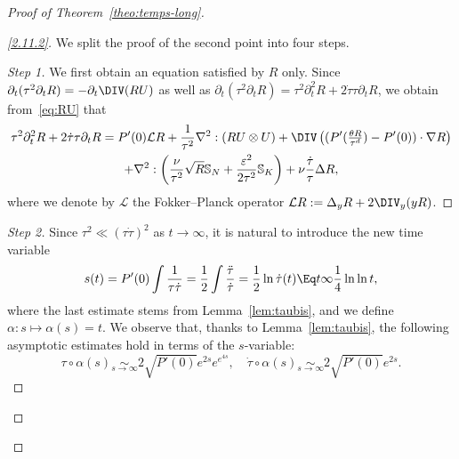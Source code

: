 \begin{proof}[Proof of Theorem~\ref{theo:temps-long}]
\begin{proof}[\eqref{2.11.2}]
We split the proof of the second point into four steps.

\begin{proof}[Step 1]
We first obtain an equation satisfied by $R$ only. Since $\partial_t(\tau^2 \partial_t R) = - \partial_t \DIV (R U)$ as well as $\partial_t(\tau^2 \partial_t R) = \tau^2 \partial_t^2 R + 2\dot \tau
\tau \partial_t R$, we obtain from~\eqref{eq:RU} that
\begin{multline*}
\tau^2 \partial_t^2 R + 2\dot \tau \tau \partial_t R = P'(0) \mathcal L R + \frac{1}{\tau^2} \nabla^2 : (R U \otimes U) + \DIV \left((P'(\tfrac{\theta R}{\tau^d}) - P'(0)) \cdot \nabla R \right)\\
+ \nabla^2: \left(\dfrac{\nu}{\tau^2} \sqrt{R} \mathbb S_N + \dfrac{\varepsilon^2}{2\tau^2} \mathbb S_{K} \right) +\nu \frac{\dot \tau}{\tau} \Delta R,
\end{multline*}
where we denote by $\mathcal L$ the Fokker--Planck operator $\mathcal L R:= \Delta_y R + 2 \DIV_y (y R)$.
\let\qed\relax
\end{proof}

\begin{proof}[Step 2]
Since $\tau^2\ll (\tau\dot \tau)^2$ as $t\to
\infty$, it is natural to introduce the new time variable
\begin{equation*}
s(t) = P'(0) \int\frac{1}{\tau\dot \tau}= \frac{1}{2}\int
\frac{\ddot \tau}{\dot \tau} = \frac{1}{2}\ln \dot \tau(t)\Eq t
\infty \frac{1}{4}\ln \ln t,
\end{equation*}
where the last estimate stems from Lemma~\ref{lem:taubis}, and we define $\alpha : s \mapsto \alpha(s) = t$. We observe that, thanks to Lemma~\ref{lem:taubis}, the following asymptotic estimates hold in terms of the $s$-variable:
\[
\tau \circ \alpha(s) \underset{s\to \infty}{\sim} 2 \sqrt{P'(0)} e^{2s} e^{e^{4s}}, \quad
\dot\tau \circ \alpha(s) \underset{s \to \infty}{\sim} 2 \sqrt{P'(0)} e^{2s}.
\]


\end{proof}
\end{proof}
\end{proof}
